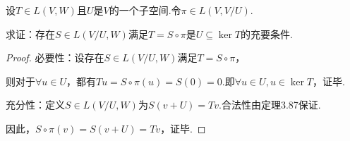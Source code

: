 \begin{comment}
    \begin{problem}[18]\label{3.E.18}
        设\(U\)是\(V\)的一个子空间且\(V/U\)是有限维向量空间.

        求证：存在\(V\)的另一个子空间\(W\)，使得\(\dim W=\dim V/U\)且\(V=U \oplus W\).
    \end{problem}

    \begin{proof}
        由于\(V/U\)是有限维向量空间，设\(v_1+U,\cdots,v_m+U\)是\(V/U\)的一组基.

        从而\(\forall v+U \in V/U,v+U=\sum_{i=1}^m a_i(v_i+U)=\sum_{i=1}^m a_iv_i+U\).
        
        即\(v-\sum_{i=1}^m a_iv_i=u \in U,v=\sum_{i=1}^m a_iv_i+u\)，得到\(V=\operatorname{span} (v_1,\cdots,v_m)+U\).
        
        下证\(v_1,\cdots,v_m\)线性无关且\(\operatorname{span} (v_1,\cdots,v_m) \cap U =\{0\}\).
        
        \(\sum_{i=1}^m a_i(v_i+U)=\sum_{i=1}^m a_iv_i+U=U \Rightarrow a_1=\cdots=a_m=0\)，即\(v_1,\cdots,v_m\)线性无关.
        
        使用反证法.若\(v_0 \ne 0 \in \operatorname{span} (v_1,\cdots,v_m) \cap U\)，
        即存在至少一个\(a_i \ne 0\)，使得\(v_0=\sum_{i=1}^m a_iv_i\).
        
        然而\(v_0 \in U \Rightarrow v_0+U=U \Rightarrow a_1=\cdots=a_m=0\).
        
        矛盾，假设不成立，令\(W=\operatorname{span} (v_1,\cdots,v_m)\)，原命题即得证.
    \end{proof}
\end{comment}

\begin{problem}[19]\label{3.E.19}
    设\(T \in L(V,W)\)且\(U\)是\(V\)的一个子空间.令\(\pi \in L(V,V/U)\).

    求证：存在\(S \in L(V/U,W)\)满足\(T=S \circ \pi\)是\(U \subseteq \ker T\)的充要条件.
\end{problem}

\begin{proof}
    必要性：设存在\(S \in L(V/U,W)\)满足\(T=S \circ \pi\)，

    则对于\(\forall u \in U\)，都有\(Tu=S \circ \pi(u)=S(0)=0\).即\(\forall u \in U,u \in \ker T\)，证毕.
    
    充分性：定义\(S \in L(V/U,W)\)为\(S(v+U)=Tv\).合法性由定理3.87保证.
    
    因此，\(S \circ \pi(v)=S(v+U)=Tv\)，证毕.
\end{proof}

